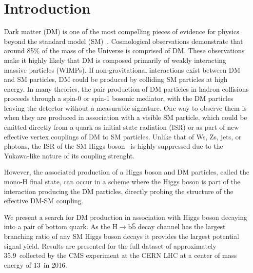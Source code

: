 \section{Introduction}

Dark matter (DM) is one of the most compelling pieces of evidence for physics beyond the standard model (SM)~\cite{FNAL_Review}. Cosmological observations demonstrate that around 85\% of the mass of the Universe is comprised of DM. These observations make it highly likely that DM is composed primarily of weakly interacting massive particles (WIMPs). If non-gravitational interactions exist between DM and SM particles, DM could be produced by colliding SM particles at high energy. In many theories, the pair production of DM particles in hadron collisions proceeds through a spin-0 or spin-1 bosonic mediator, with the DM particles leaving the detector without a measurable signature. One way to observe them is when they are produced in association with a visible SM particle, which could be emitted directly from a quark as initial state radiation (ISR) or as part of new effective vertex couplings of DM to SM particles. 
Unlike that of Ws, Zs, jets, or photons, the ISR of the SM Higgs boson~\cite{HiggsObs_ATLAS, HiggsObs_CMS, HiggsObs_CMS_Long} is highly suppressed due to the Yukawa-like nature of its coupling strenght.

However, the associated production of a Higgs boson and DM particles, called the mono-H final state, can occur in a scheme where the Higgs boson is part of the interaction producing the DM particles, directly probing the structure of the effective DM-SM coupling.

We present a search for DM production in association with Higgs boson
decaying into a pair of bottom quark. As the H$\rightarrow \mathrm{b
  \bar{b}}$ decay channel has the largest branching ratio of any SM
Higgs boson decays it provides the largest potential signal yield. Results are presented for the full dataset of approximately 35.9~\fbinv collected by the CMS experiment at the CERN LHC at a center of mass energy of 13\TeV~in 2016. 


